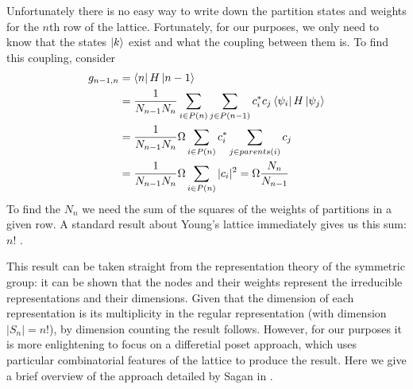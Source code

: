 Unfortunately there is no easy way to write down the partition states and weights for the $n$th row of the lattice. Fortunately, for our purposes, we only need to know that the states $\left\vert k\right\rangle$ exist and what the coupling between them is. To find this coupling, consider
\begin{align}
  g_{n-1,n} & = \left\langle n\right\vert H\left\vert n-1\right\rangle \nonumber\\
  & = \frac{1}{N_{n-1}N_n}\sum_{i\in P(n)}\sum_{j\in
  P(n-1)}c_{i}^{*}c_{j}\left\langle \psi_{i}\right\vert H\left\vert\psi_{j}\right\rangle \nonumber\\
  & = \frac{1}{N_{n-1}N_n}\Omega\sum_{i\in P(n)}c_{i}^{*}\sum_{j\in
  parents(i)}c_{j} \nonumber\\
  & = \frac{1}{N_{n-1}N_n}\Omega\sum_{i\in P(n)}|c_{i}|^{2} =
  \Omega\frac{ N_n}{N_{n-1}}\label{coupling_as_sum_c2}\end{align}
To find the $N_n$ we need the sum of the squares of the weights of partitions in a given row. A standard result about Young's lattice immediately gives us this sum: $n!$ \cite{STANLEY:1975p6605}.

This result can be taken straight from the representation theory of the symmetric group: it can be shown that the nodes and their weights represent the irreducible representations and their dimensions. Given that the dimension of each representation is its multiplicity in the regular representation (with dimension $|S_n| = n!$), by dimension counting the result follows. However, for our purposes it is more enlightening to focus on a differetial poset approach, which uses particular combinatorial features of the lattice to produce the result. Here we give a brief overview of the approach detailed by Sagan in \cite{Sagan:2001p6568}.


